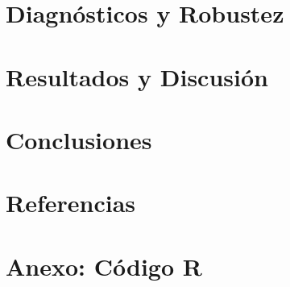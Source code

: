 \documentclass[11pt, a4paper]{article}
\begin{document}
\section{Diagn\'osticos y Robustez}

\section{Resultados y Discusi\'on}

\section{Conclusiones}

\section*{Referencias}

\section*{Anexo: C\'odigo R}
\end{document}
